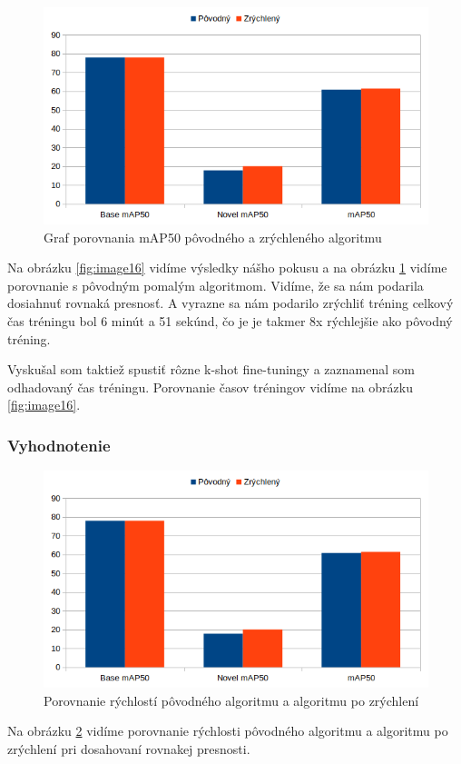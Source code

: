 \begin{figure}[H]
\centering
\includegraphics[width=\textwidth]{images/fastest_chart.png}
\caption{Graf porovnania mAP50 pôvodného a zrýchleného algoritmu}
\label{fig:image17}
\end{figure}

Na obrázku \ref{fig:image16} vidíme výsledky nášho pokusu a na obrázku \ref{fig:image17} vidíme porovnanie s pôvodným pomalým algoritmom. Vidíme, že sa nám podarila dosiahnuť rovnaká presnosť. A vyrazne sa nám podarilo zrýchliť tréning celkový čas tréningu bol 6 minút a 51 sekúnd, čo je je takmer 8x rýchlejšie ako pôvodný tréning. 

Vyskušal som taktiež spustiť rôzne k-shot fine-tuningy a zaznamenal som odhadovaný čas tréningu. Porovnanie časov tréningov vidíme na obrázku \ref{fig:image16}.

\subsubsection{Vyhodnotenie}

\begin{figure}[H]
\centering
\includegraphics[width=\textwidth]{images/fastest_chart.png}
\caption{Porovnanie rýchlostí pôvodného algoritmu a algoritmu po zrýchlení}
\label{fig:image500}
\end{figure}

Na obrázku \ref{fig:image500} vidíme porovnanie rýchlosti pôvodného algoritmu a algoritmu po zrýchlení pri dosahovaní rovnakej presnosti. 







